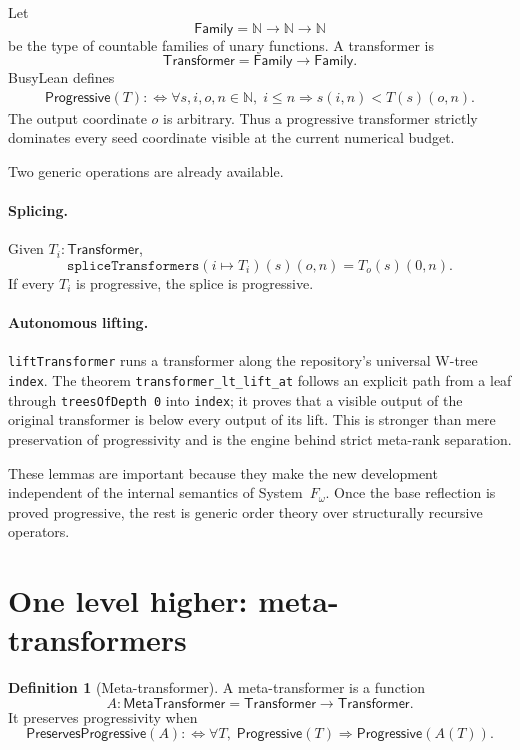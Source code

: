 \documentclass[11pt]{article}
\theoremstyle{definition}
\newtheorem{definition}[theorem]{Definition}
\theoremstyle{remark}
\newcommand{\N}{\mathbb{N}}
\newcommand{\Family}{\mathsf{Family}}
\newcommand{\Transformer}{\mathsf{Transformer}}
\newcommand{\Meta}{\mathsf{MetaTransformer}}
\newcommand{\Prog}{\mathsf{Progressive}}
\newcommand{\Pres}{\mathsf{PreservesProgressive}}
\newcommand{\lean}[1]{\texttt{#1}}
\begin{document}
Let
\[
  \Family = \N\to\N\to\N
\]
be the type of countable families of unary functions.  A transformer is
\[
  \Transformer = \Family\to\Family.
\]
BusyLean defines
\[
\begin{split}
\Prog(T) :\Longleftrightarrow
  \forall s,i,o,n\in\N,
  \;i\le n\Longrightarrow s(i,n)<T(s)(o,n).
\end{split}
\]
The output coordinate \(o\) is arbitrary.  Thus a progressive transformer
strictly dominates every seed coordinate visible at the current numerical
budget.

Two generic operations are already available.

\paragraph{Splicing.}
Given \(T_i:\Transformer\),
\[
  \lean{spliceTransformers}(i\mapsto T_i)(s)(o,n)
  = T_o(s)(0,n).
\]
If every \(T_i\) is progressive, the splice is progressive.

\paragraph{Autonomous lifting.}
\lean{liftTransformer} runs a transformer along the repository's universal
W-tree \lean{index}.  The theorem
\lean{transformer\_lt\_lift\_at} follows an explicit path from a leaf through
\lean{treesOfDepth 0} into \lean{index}; it proves that a visible output of the
original transformer is below every output of its lift.  This is stronger than
mere preservation of progressivity and is the engine behind strict meta-rank
separation.

These lemmas are important because they make the new development independent
of the internal semantics of System~$F_\omega$.  Once the base reflection is
proved progressive, the rest is generic order theory over structurally
recursive operators.

\section{One level higher: meta-transformers}

\begin{definition}[Meta-transformer]
A meta-transformer is a function
\[
  A:\Meta = \Transformer\to\Transformer.
\]
It preserves progressivity when
\[
  \Pres(A) :\Longleftrightarrow
  \forall T,\;\Prog(T)\Longrightarrow\Prog(A(T)).
\]
\end{definition}
\end{document}
